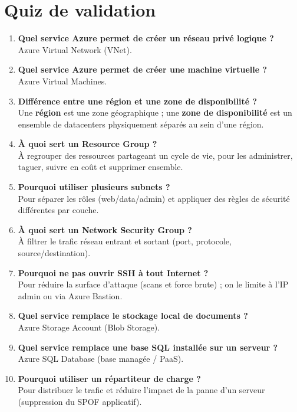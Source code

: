 \documentclass[11pt,a4paper]{article}
\begin{document}
\section{Quiz de validation}

\begin{enumerate}[leftmargin=2.2em]
\item \textbf{Quel service Azure permet de créer un réseau privé logique ?}\\ Azure Virtual Network (VNet).
\item \textbf{Quel service Azure permet de créer une machine virtuelle ?}\\ Azure Virtual Machines.
\item \textbf{Différence entre une région et une zone de disponibilité ?}\\ Une \textbf{région} est une zone géographique ; une \textbf{zone de disponibilité} est un ensemble de datacenters physiquement séparés au sein d'une région.
\item \textbf{À quoi sert un Resource Group ?}\\ À regrouper des ressources partageant un cycle de vie, pour les administrer, taguer, suivre en coût et supprimer ensemble.
\item \textbf{Pourquoi utiliser plusieurs subnets ?}\\ Pour séparer les rôles (web/data/admin) et appliquer des règles de sécurité différentes par couche.
\item \textbf{À quoi sert un Network Security Group ?}\\ À filtrer le trafic réseau entrant et sortant (port, protocole, source/destination).
\item \textbf{Pourquoi ne pas ouvrir SSH à tout Internet ?}\\ Pour réduire la surface d'attaque (scans et force brute) ; on le limite à l'IP admin ou via Azure Bastion.
\item \textbf{Quel service remplace le stockage local de documents ?}\\ Azure Storage Account (Blob Storage).
\item \textbf{Quel service remplace une base SQL installée sur un serveur ?}\\ Azure SQL Database (base managée / PaaS).
\item \textbf{Pourquoi utiliser un répartiteur de charge ?}\\ Pour distribuer le trafic et réduire l'impact de la panne d'un serveur (suppression du SPOF applicatif).

\end{enumerate}
\end{document}
